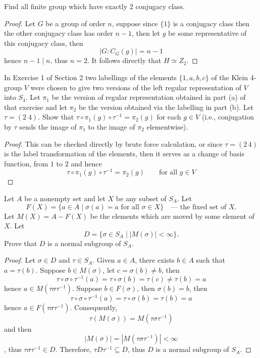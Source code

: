 \documentclass{article}
\newenvironment{problem}[2][Problem]{\begin{trivlist}
\item[\hskip \labelsep {\bfseries #1}\hskip \labelsep {\bfseries #2.}]}{\end{trivlist}}
\begin{document}
\begin{problem}{13}
    Find all finite group which have exactly $2$ conjugacy class.
\end{problem}
\begin{proof}
    Let $G$ be a group of order $n$, suppose since $\{1\}$ is a conjugacy class then the other conjugacy class has order $n-1$, then let $g$ be some representative of this conjugacy class, then
    \[
        |G:C_G(g)| = n-1
    \]
    hence $n-1 \mid n$, thus $n=2$. It follows directly that $H \simeq Z_2$.
\end{proof}
\begin{problem}{14}
    In Exercise 1 of Section 2 two labellings of the elements $\{1, a, b, c\}$ of the Klein 4-group $V$ were chosen to give two versions of the left regular representation of $V$ into $S_4$. Let $\pi_1$ be the version of regular representation obtained in part (a) of that exercise and let $\pi_2$ be the version obtained via the labelling in part (b). Let $\tau = (2 \; 4)$. Show that $\tau \circ \pi_1(g) \circ \tau^{-1} = \pi_2(g)$ for each $g \in V$ (i.e., conjugation by $\tau$ sends the image of $\pi_1$ to the image of $\pi_2$ elementwise).
\end{problem}
\begin{proof}
    This can be checked directly by brute force calculation, or since $\tau=(2\, 4)$ is the label transformation of the elements, then it serves as a change of basis function, from $1$ to $2$ and hence 
    \[
        \tau \circ \pi_1(g) \circ \tau^{-1} = \pi_2(g) \qquad \text{for all }g \in V
    \]
\end{proof}
\begin{problem}{17}
    Let $A$ be a nonempty set and let $X$ be any subset of $S_A$. Let
\[
F(X) = \{a \in A \mid \sigma(a) = a \text{ for all } \sigma \in X\} \quad \text{--- the fixed set of } X.
\]
Let $M(X) = A - F(X)$ be the elements which are moved by some element of $X$. Let
\[
D = \{\sigma \in S_A \mid |M(\sigma)| < \infty\}.
\]
Prove that $D$ is a normal subgroup of $S_A$.
\end{problem}
\begin{proof}
    Let $\sigma \in D$ and $\tau \in S_A$. Given $a\in A$, there exists $b \in A$ such that $a =\tau (b)$. Suppose $b \in M(\sigma)$, let $c=\sigma(b)\neq b$, then
    \[
    \tau \circ \sigma \circ \tau^{-1}(a) = \tau \circ \sigma(b) =  \tau (c)\neq \tau(b)=a 
    \]
    hence $a \in M(\tau \sigma \tau^{-1})$. Suppose $b \in F(\sigma)$, then $\sigma(b)=b$, then 
        \[
    \tau \circ \sigma \circ \tau^{-1}(a) = \tau \circ \sigma(b) =  \tau (b)=a
    \]
    hence $a \in F(\tau \sigma \tau^{-1})$. Consequently, 
    \[
        \tau(M(\sigma))=M(\tau \sigma \tau^{-1})
    \]
    and then 
    \[
        |M(\sigma)|=|M(\tau\sigma\tau^{-1})|<\infty
    \]
    , thus $\tau\sigma\tau^{-1}\in D$. Therefore, $\tau D\tau^{-1}\subseteq D$, thus $D$ is a normal subgroup of $S_A$.
\end{proof}
\end{document}
